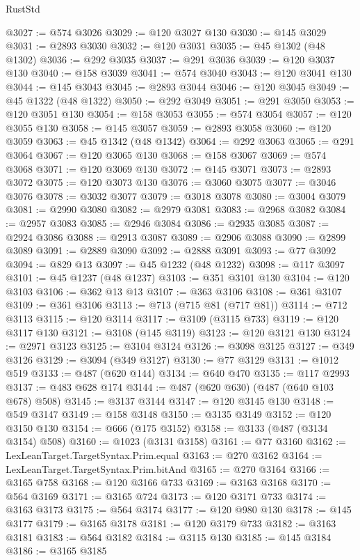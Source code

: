 \begin{lexlean}{RustStd}
\begin{coremodule}
{\begin{coremodule}
{{{{{{{{{{{{{{{{{{{{{{{{{{{{{{{{{{{{{{{{{{{{{{{{{{{{{{{{{{{{@3027 := @574 @3026
@3029 := @120 @3027 @130
@3030 := @145 @3029
@3031 := @2893 @3030
@3032 := @120 @3031
@3035 := @45 @1302 (@48 @1302)
@3036 := @292 @3035
@3037 := @291 @3036
@3039 := @120 @3037 @130
@3040 := @158 @3039
@3041 := @574 @3040
@3043 := @120 @3041 @130
@3044 := @145 @3043
@3045 := @2893 @3044
@3046 := @120 @3045
@3049 := @45 @1322 (@48 @1322)
@3050 := @292 @3049
@3051 := @291 @3050
@3053 := @120 @3051 @130
@3054 := @158 @3053
@3055 := @574 @3054
@3057 := @120 @3055 @130
@3058 := @145 @3057
@3059 := @2893 @3058
@3060 := @120 @3059
@3063 := @45 @1342 (@48 @1342)
@3064 := @292 @3063
@3065 := @291 @3064
@3067 := @120 @3065 @130
@3068 := @158 @3067
@3069 := @574 @3068
@3071 := @120 @3069 @130
@3072 := @145 @3071
@3073 := @2893 @3072
@3075 := @120 @3073 @130
@3076 := @3060 @3075
@3077 := @3046 @3076
@3078 := @3032 @3077
@3079 := @3018 @3078
@3080 := @3004 @3079
@3081 := @2990 @3080
@3082 := @2979 @3081
@3083 := @2968 @3082
@3084 := @2957 @3083
@3085 := @2946 @3084
@3086 := @2935 @3085
@3087 := @2924 @3086
@3088 := @2913 @3087
@3089 := @2906 @3088
@3090 := @2899 @3089
@3091 := @2889 @3090
@3092 := @2888 @3091
@3093 := @77 @3092
@3094 := @829 @13
@3097 := @45 @1232 (@48 @1232)
@3098 := @117 @3097
@3101 := @45 @1237 (@48 @1237)
@3103 := @351 @3101 @130
@3104 := @120 @3103
@3106 := @362 @13 @13
@3107 := @363 @3106
@3108 := @361 @3107
@3109 := @361 @3106
@3113 := @713 (@715 @81 (@717 @81))
@3114 := @712 @3113
@3115 := @120 @3114
@3117 := @3109 (@3115 @733)
@3119 := @120 @3117 @130
@3121 := @3108 (@145 @3119)
@3123 := @120 @3121 @130
@3124 := @2971 @3123
@3125 := @3104 @3124
@3126 := @3098 @3125
@3127 := @349 @3126
@3129 := @3094 (@349 @3127)
@3130 := @77 @3129
@3131 := @1012 @519
@3133 := @487 (@620 @144)
@3134 := @640 @470
@3135 := @117 @2993
@3137 := @483 @628 @174
@3144 := @487 (@620 @630) (@487 (@640 @103 @678) @508)
@3145 := @3137 @3144
@3147 := @120 @3145 @130
@3148 := @549 @3147
@3149 := @158 @3148
@3150 := @3135 @3149
@3152 := @120 @3150 @130
@3154 := @666 (@175 @3152)
@3158 := @3133 (@487 (@3134 @3154) @508)
@3160 := @1023 (@3131 @3158)
@3161 := @77 @3160
@3162 := LexLeanTarget.TargetSyntax.Prim.equal
@3163 := @270 @3162
@3164 := LexLeanTarget.TargetSyntax.Prim.bitAnd
@3165 := @270 @3164
@3166 := @3165 @758
@3168 := @120 @3166 @733
@3169 := @3163 @3168
@3170 := @564 @3169
@3171 := @3165 @724
@3173 := @120 @3171 @733
@3174 := @3163 @3173
@3175 := @564 @3174
@3177 := @120 @980 @130
@3178 := @145 @3177
@3179 := @3165 @3178
@3181 := @120 @3179 @733
@3182 := @3163 @3181
@3183 := @564 @3182
@3184 := @3115 @130
@3185 := @145 @3184
@3186 := @3165 @3185
}}}}}}}}}}}}}}}}}}}}}}}}}}}}}}}}}}}}}}}}}}}}}}}}}}}}}}}}}}}}
\end{coremodule}}
\end{coremodule}
\end{lexlean}
